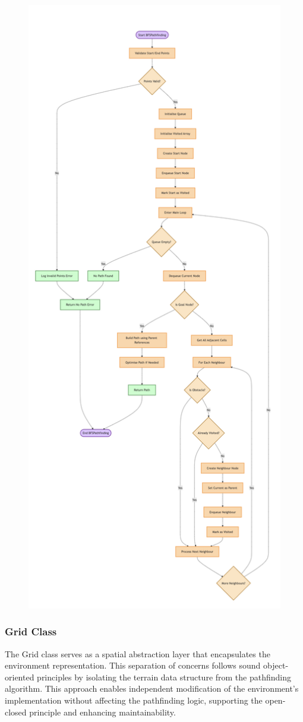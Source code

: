 \begin{figure}[!htbp]
    \centering
    \includegraphics[width=0.56\linewidth]{Flowcharts/BFS2.png}
\end{figure}

\newpage


\subsubsection*{Grid Class}
The Grid class serves as a spatial abstraction layer that encapsulates the environment representation. This separation of concerns follows sound object-oriented principles by isolating the terrain data structure from the pathfinding algorithm. This approach enables independent modification of the environment's implementation without affecting the pathfinding logic, supporting the open-closed principle and enhancing maintainability.

